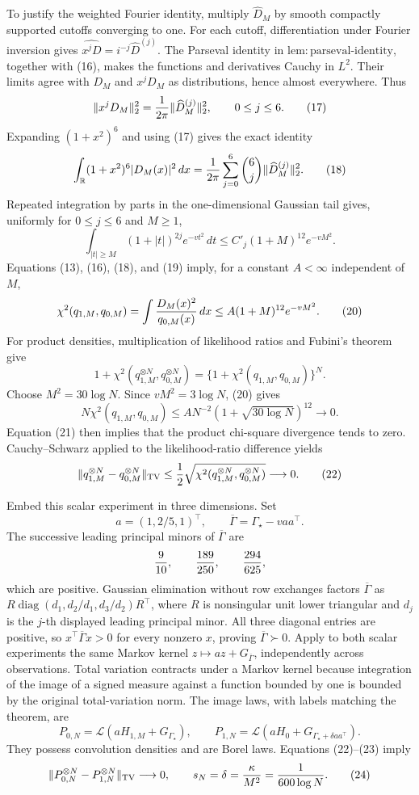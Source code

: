 To justify the weighted Fourier identity, multiply \(\widehat D_M\) by smooth compactly supported cutoffs converging to one.  For each cutoff, differentiation under Fourier inversion gives \(\widehat{x^jD}=i^{-j}\widehat D^{(j)}\).  The Parseval identity in \(\mathrm{lem:parseval\text{-}identity}\), together with (16), makes the functions and derivatives Cauchy in \(L^2\).  Their limits agree with \(D_M\) and \(x^jD_M\) as distributions, hence almost everywhere.  Thus
\[
 \|x^jD_M\|_2^2={1\over2\pi}\|\widehat D_M^{(j)}\|_2^2,
 \qquad0\le j\le6. \tag{17}
\]
Expanding \((1+x^2)^6\) and using (17) gives the exact identity
\[
 \int_{\mathbb R}(1+x^2)^6|D_M(x)|^2\,dx
 ={1\over2\pi}\sum_{j=0}^6{6\choose j}
 \|\widehat D_M^{(j)}\|_2^2. \tag{18}
\]
Repeated integration by parts in the one-dimensional Gaussian tail gives, uniformly for \(0\le j\le6\) and \(M\ge1\),
\[
 \int_{|t|\ge M}(1+|t|)^{2j}e^{-vt^2}\,dt
 \le C'_j(1+M)^{12}e^{-vM^2}. \tag{19}
\]
Equations (13), (16), (18), and (19) imply, for a constant \(A<\infty\) independent of \(M\),
\[
 \chi^2(q_{1,M},q_{0,M})
 =\int {D_M(x)^2\over q_{0,M}(x)}\,dx
 \le A(1+M)^{12}e^{-vM^2}. \tag{20}
\]
For product densities, multiplication of likelihood ratios and Fubini's theorem give
\[
 1+\chi^2(q_{1,M}^{\otimes N},q_{0,M}^{\otimes N})
 =\{1+\chi^2(q_{1,M},q_{0,M})\}^{N}. \tag{21}
\]
Choose \(M^2=30\log N\).  Since \(vM^2=3\log N\), (20) gives
\[
 N\chi^2(q_{1,M},q_{0,M})
 \le A N^{-2}(1+\sqrt{30\log N})^{12}\longrightarrow0.
\]
Equation (21) then implies that the product chi-square divergence tends to zero.  Cauchy--Schwarz applied to the likelihood-ratio difference yields
\[
 \|q_{1,M}^{\otimes N}-q_{0,M}^{\otimes N}\|_{\mathrm{TV}}
 \le{1\over2}\sqrt{\chi^2(q_{1,M}^{\otimes N},q_{0,M}^{\otimes N})}
 \longrightarrow0. \tag{22}
\]

Embed this scalar experiment in three dimensions.  Set
\[
 a=(1,2/5,1)^\top,\qquad
 \overline\Gamma=\Gamma_\star-vaa^\top.
\]
The successive leading principal minors of \(\overline\Gamma\) are
\[
 {9\over10},\qquad {189\over250},\qquad {294\over625},
\]
which are positive.  Gaussian elimination without row exchanges factors \(\overline\Gamma\) as \(R\operatorname{diag}(d_1,d_2/d_1,d_3/d_2)R^\top\), where \(R\) is nonsingular unit lower triangular and \(d_j\) is the \(j\)-th displayed leading principal minor.  All three diagonal entries are positive, so \(x^\top\overline\Gamma x>0\) for every nonzero \(x\), proving \(\overline\Gamma\succ0\).  Apply to both scalar experiments the same Markov kernel \(z\mapsto az+G_{\overline\Gamma}\), independently across observations.  Total variation contracts under a Markov kernel because integration of the image of a signed measure against a function bounded by one is bounded by the original total-variation norm.  The image laws, with labels matching the theorem, are
\[
 P_{0,N}=\mathcal L(aH_{1,M}+G_{\Gamma_\star}),
 \qquad
 P_{1,N}=\mathcal L(aH_0+G_{\Gamma_\star+\delta aa^\top}). \tag{23}
\]
They possess convolution densities and are Borel laws.  Equations (22)--(23) imply
\[
 \|P_{0,N}^{\otimes N}-P_{1,N}^{\otimes N}\|_{\mathrm{TV}}
 \longrightarrow0,
 \qquad
 s_N=\delta={\kappa\over M^2}={1\over600\log N}. \tag{24}
\]

